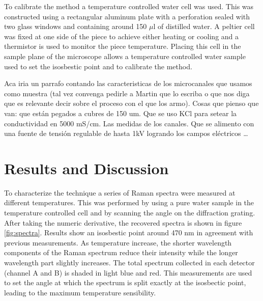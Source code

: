 \documentclass[twocolumn]{svjour3}       %
\begin{document}
To calibrate the method a temperature controlled water cell was used. This was constructed using a rectangular aluminum plate with a perforation sealed with two glass windows and containing around 150 $\mu$l of distilled water. A peltier cell was fixed at one side of the piece to achieve either heating or cooling and a thermistor is used to monitor the piece temperature.  Placing this cell in the sample plane of the microscope allows a temperature controlled water sample used to set the isosbestic point and to calibrate the method. 

Aca iria un parrafo contando las caracteristicas de los microcanales que usamos como muestra (tal vez convenga pedirle a Martin que lo escriba o que nos diga que es relevante decir sobre el proceso con el que los armo). Cosas que pienso que van: que están pegados a cubres de 150 um. Que se uso KCl para setear la conductividad en 5000 mS/cm. Las medidas de los canales. Que se alimento con una fuente de tensión regulable de hasta 1kV logrando los campos eléctricos …



\section{Results and Discussion}

To characterize the technique a series of Raman spectra were measured at different temperatures. This was performed by using a pure water sample in the temperature controlled cell and by scanning the angle on the diffraction grating. After taking the numeric derivative, the recovered spectra is shown in figure \ref{fig:spectra}. Results show an isosbestic point around 470 nm in agreement with previous measurements\cite{walrafen1}. As temperature increase, the shorter wavelength components of the Raman spectrum reduce their intensity while the longer wavelength part slightly increases. The total spectrum collected in each detector (channel A and B) is shaded in light blue and red. This measurements are used to set the angle at which the spectrum is split exactly at the isosbectic point, leading to the maximum temperature sensibility. 
\end{document}
